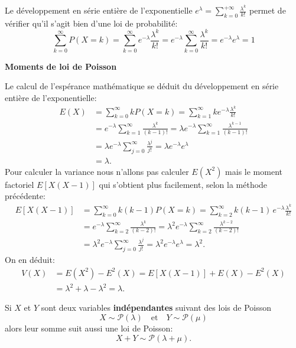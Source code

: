 \documentclass[]{book}
\theoremstyle{magentacolor}
\theoremstyle{proprie}
\theoremstyle{exstyle}
\theoremstyle{exostyle}
\theoremstyle{definition}
\theoremstyle{definition}
\theoremstyle{definition}
\theoremstyle{remark}
\let\BeginKnitrBlock\begin \let\EndKnitrBlock\end
\begin{document}
Le développement en série entière de l'exponentielle
\(e^\lambda=\sum_{k=0}^{+\infty} \frac{\lambda^k}{k!}\) permet de
vérifier qu'il s'agit bien d'une loi de probabilité:
\[\sum_{k=0}^{\infty} P(X=k)=\sum_{k=0}^{\infty} e^{-\lambda} \frac{\lambda^k}{k!}=e^{-\lambda}\sum_{k=0}^{\infty} \frac{\lambda^k}{k!}=e^{-\lambda}e^{\lambda}=1\]

\textbf{Moments de loi de Poisson}

Le calcul de l'espérance mathématique se déduit du développement en
série entière de l'exponentielle: \[\begin{aligned}
    E(X)&=\sum_{k=0}^{\infty} k P(X=k)=\sum_{k=1}^{\infty} k e^{-\lambda} \frac{\lambda^k}{k!} \\
        &=e^{-\lambda} \sum_{k=1}^{\infty}  \frac{\lambda^k}{(k-1)!}=\lambda e^{-\lambda} \sum_{k=1}^{\infty}  \frac{\lambda^{k-1}}{(k-1)!} \\
        &= \lambda e^{-\lambda} \sum_{j=0}^{\infty}  \frac{\lambda^{j}}{j!}= \lambda e^{-\lambda}  e^{\lambda} \\
        &= \lambda.\end{aligned}\] Pour calculer la variance nous
n'allons pas calculer \(E(X^2)\) mais le moment factoriel \(E[X(X-1)]\) qui
s'obtient plus facilement, selon la méthode précédente:
\[\begin{aligned}
    E[X(X-1)] &=\sum_{k=0}^{\infty} k(k-1)P(X=k)=\sum_{k=2}^{\infty} k(k-1)  \,e^{-\lambda} \frac{\lambda^k}{k!} \\
        &=e^{-\lambda} \sum_{k=2}^{\infty}  \frac{\lambda^k}{(k-2)!}=\lambda^2 e^{-\lambda} \sum_{k=2}^{\infty}  \frac{\lambda^{k-2}}{(k-2)!} \\ 
        &= \lambda^2 e^{-\lambda} \sum_{j=0}^{\infty}  \frac{\lambda^{j}}{j!}= \lambda^2 e^{-\lambda}  e^{\lambda} = \lambda^2.\end{aligned}\]
On en déduit: \[\begin{aligned}
    V(X)&=E(X^2)-E^2(X)=E[X(X-1)]+E(X)-E^2(X) \\
        &=\lambda^2+\lambda-\lambda^2=\lambda.\end{aligned}\]

\BeginKnitrBlock{theorem}
\protect\hypertarget{thm:unnamed-chunk-30}{}{\label{thm:unnamed-chunk-30} }Si \(X\) et \(Y\) sont deux variables \textbf{indépendantes} suivant des lois de
Poisson
\[X \sim \mathcal{P}(\lambda) \quad \text{et} \quad Y \sim \mathcal{P}(\mu)\]
alors leur somme suit aussi une loi de Poisson:
\[X+Y \sim \mathcal{P}(\lambda+\mu).\]
\EndKnitrBlock{theorem}
\end{document}
